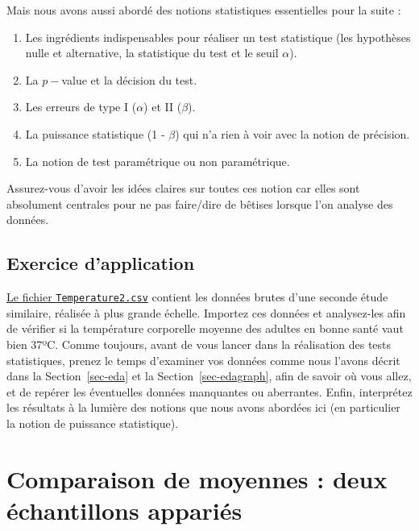 \documentclass[
  a4paper,
  DIV=11,
  numbers=noendperiod,
  oneside]{scrreprt}
\providecommand{\tightlist}{%
  \setlength{\itemsep}{0pt}\setlength{\parskip}{0pt}}\usepackage{longtable,booktabs,array}
\begin{document}
Mais nous avons aussi abordé des notions statistiques essentielles pour
la suite :

\begin{enumerate}
\def\labelenumi{\arabic{enumi}.}
\tightlist
\item
  Les ingrédients indispensables pour réaliser un test statistique (les
  hypothèses nulle et alternative, la statistique du test et le seuil
  \(\alpha\)).
\item
  La \(p-\)value et la décision du test.
\item
  Les erreurs de type I (\(\alpha\)) et II (\(\beta\)).
\item
  La puissance statistique (1 - \(\beta\)) qui n'a rien à voir avec la
  notion de précision.
\item
  La notion de test paramétrique ou non paramétrique.
\end{enumerate}

Assurez-vous d'avoir les idées claires sur toutes ces notion car elles
sont absolument centrales pour ne pas faire/dire de bêtises lorsque l'on
analyse des données.

\hypertarget{exercice-dapplication}{%
\section{Exercice d'application}\label{exercice-dapplication}}

\href{data/Temperature2.csv}{Le fichier \texttt{Temperature2.csv}}
contient les données brutes d'une seconde étude similaire, réalisée à
plus grande échelle. Importez ces données et analysez-les afin de
vérifier si la température corporelle moyenne des adultes en bonne santé
vaut bien 37ºC. Comme toujours, avant de vous lancer dans la réalisation
des tests statistiques, prenez le temps d'examiner vos données comme
nous l'avons décrit dans la Section~\ref{sec-eda} et la
Section~\ref{sec-edagraph}, afin de savoir où vous allez, et de repérer
les éventuelles données manquantes ou aberrantes. Enfin, interprétez les
résultats à la lumière des notions que nous avons abordées ici (en
particulier la notion de puissance statistique).


\hypertarget{sec-moy2}{%
\chapter{Comparaison de moyennes : deux échantillons
appariés}\label{sec-moy2}}
\end{document}
